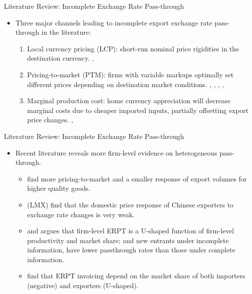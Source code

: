 \documentclass[10pt]{beamer}
\begin{document}
\begin{frame}{Literature Review: Incomplete Exchange Rate Pass-through}
	\begin{itemize}
		\item Three major channels leading to incomplete export exchange rate pass-through in the literature:
		\begin{enumerate}
			\item Local currency pricing (LCP): short-run nominal price rigidities in the destination currency. \cite{engel2002}, \cite{gopinath2008}
			\item Pricing-to-market (PTM): firms with variable markups optimally set different prices depending on destination market conditions. \cite{atkeson2008}, \cite{bmm2012}, \cite{manova-zhang2012}, \cite{gopinath2010-currency}, \cite{gopinath2010-frequency}
			\item Marginal production cost: home currency appreciation will decrease marginal costs due to cheaper imported inputs, partially offsetting export price changes. \cite{aik2014}, \cite{chatterjee2013}
		\end{enumerate}
\end{itemize}
\end{frame}

\begin{frame}{Literature Review: Incomplete Exchange Rate Pass-through}
	\begin{itemize}
		\item Recent literature reveals more firm-level evidence on heterogeneous pass-through.
		\begin{itemize}
			\item \cite{chen2016} find more pricing-to-market and a smaller response of export volumes for higher quality goods.
			\item \cite{lmx2015} (LMX) find that the domestic price response of Chinese exporters to exchange rate changes is very weak.
			\item \cite{garetto2016} and \cite{auer2016}
			argues that firm-level ERPT is a U-shaped function of firm-level productivity and market share; and new entrants under incomplete information, have lower passthrough rates than those under complete information.
			\item \cite{devereux2017} find that ERPT invoicing depend on the market share of both importers (negative) and exporters (U-shaped).
		\end{itemize}
	\end{itemize}
\end{frame}
\end{document}
